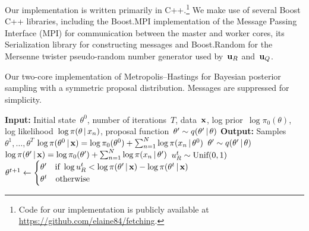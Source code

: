 \documentclass[angelino.tex]{subfiles}
\begin{document}
Our implementation is written primarily in C++.\footnote{Code for our
implementation is publicly available at \url{https://github.com/elaine84/fetching}.}
%
We make use of several Boost C++ libraries,
including the Boost.MPI implementation of the Message Passing Interface (MPI)
for communication between the master and worker cores,
its Serialization library for constructing messages
and Boost.Random for the Mersenne twister pseudo-random number generator
used by~$\mathbf{u}_R$ and~$\mathbf{u}_Q$.

\begin{algorithm}[t]
\caption{Our two-core implementation of Metropolis--Hastings for Bayesian posterior sampling with a symmetric proposal distribution. Messages are suppressed for simplicity.}
\label{mh-bayesian}
\begin{algorithmic}
\State \textbf{Input:} Initial state~$\theta^0$, number of iterations~$T$, data~$\mathbf{x}$, log prior~$\log \pi_0(\theta)$, log likelihood~$\log \pi(\theta \,|\, x_n)$, proposal function~${\theta' \sim q(\theta' \,|\, \theta)}$
\State \textbf{Output:} Samples $\theta^1, \dots, \theta^T$
\vspace{1mm}
\State $\log \pi(\theta^0 \,|\, \mathbf{x}) =  \log \pi_0(\theta^0) + \sum_{n=1}^N \log \pi(x_n \,|\, \theta^0)$
\vspace{1mm}
\vspace{1mm}
\State $\theta' \sim q(\theta' \,|\, \theta)$
\vspace{1mm}
\State $\log \pi(\theta' \,|\, \mathbf{x}) =  \log \pi_0(\theta') + \sum_{n=1}^N \log \pi(x_n \,|\, \theta')$
\vspace{1mm}
\State $u_R^t \sim \mbox{Unif}(0, 1)$
\vspace{1mm}
\State $\theta^{t+1} \gets
\begin{cases}
\theta' \quad \text{if}~\log u_R^t < \log \pi(\theta' \,|\, \mathbf{x}) - \log \pi(\theta^t \,|\, \mathbf{x}) \\
\theta^t \quad \text{otherwise}
\end{cases}$
\EndFor
\end{algorithmic}
\end{algorithm}
\end{document}

